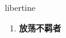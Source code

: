 
\begin{frame}
{\huge libertine}
\begin{center}
\begin{enumerate}\Large
  \item \textbf{放荡不羁者}
\end{enumerate}
\end{center}
\end{frame}
